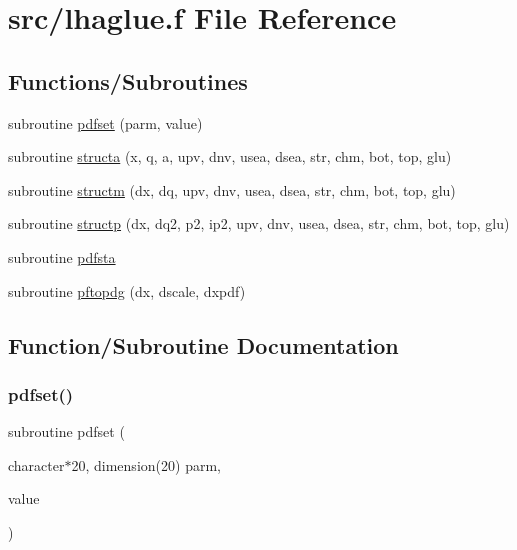 \hypertarget{lhaglue_8f}{}\section{src/lhaglue.f File Reference}
\label{lhaglue_8f}
\subsection*{Functions/\+Subroutines}
\begin{DoxyCompactItemize}
\item 
subroutine \hyperlink{lhaglue_8f_aaa99fb39a556b02baf99bbc1a251050a}{pdfset} (parm, value)
\item 
subroutine \hyperlink{lhaglue_8f_affbeec06ae9e7c00e46b28b8dce5d1d5}{structa} (x, q, a, upv, dnv, usea, dsea, str, chm, bot, top, glu)
\item 
subroutine \hyperlink{lhaglue_8f_a48c73a508b0c249f810fcabae7e29b01}{structm} (dx, dq, upv, dnv, usea, dsea, str, chm, bot, top, glu)
\item 
subroutine \hyperlink{lhaglue_8f_ac9129e9599a2f7d78477bb112fce9ec5}{structp} (dx, dq2, p2, ip2, upv, dnv, usea, dsea, str, chm, bot, top, glu)
\item 
subroutine \hyperlink{lhaglue_8f_ac540d75e892d266bf9f81c2278314d30}{pdfsta}
\item 
subroutine \hyperlink{lhaglue_8f_a3ac5221acf946b2057ae65d0bd9b607a}{pftopdg} (dx, dscale, dxpdf)
\end{DoxyCompactItemize}


\subsection{Function/\+Subroutine Documentation}
\mbox{\label{lhaglue_8f_aaa99fb39a556b02baf99bbc1a251050a}} 
\subsubsection{\texorpdfstring{pdfset()}{pdfset()}}
{\footnotesize\ttfamily subroutine pdfset (\begin{DoxyParamCaption}\item[{character$\ast$20, dimension(20)}]{parm,  }\item[{}]{value }\end{DoxyParamCaption})}

